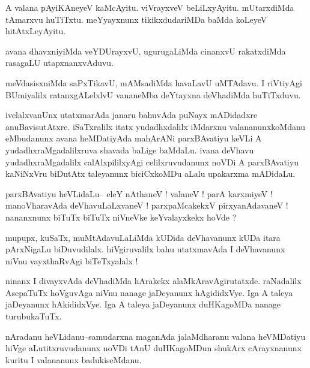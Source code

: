 \documentclass{article}
\begin{document}
\begin{mn}%
A valana pAyiKAneyeV kaMcAyitu. viVrayxveV beLiLxyAyitu. mUtarxdiMda tAmarxvu huTiTxtu. 
meYyayxnunx tikikxdudariMDa baMda koLeyeV hitAtxLeyAyitu.
\end{mn}

\begin{mn}%
avana dhavxniyiMda veYDUrayxvU, ugurugaLiMda cinanxvU rakatxdiMda rasagaLU utapxnanxvAduvu.
\end{mn}

\begin{mn}%
meVdasisxniMda saPxTikavU, mAMsadiMda havaLavU uMTAdavu. I riVtiyAgi BUmiyalilx 
ratanxgALelxlvU vananeMba deYtayxna deVhadiMda huTiTxduvu.
\end{mn}

\begin{mn}%
ivelalxvanUnx utatxmarAda janaru bahuvAda puNayx mADidadxre anuBavisutAtxre. iSaTxralilx 
itatx yudadhxdalilx iMdarxnu valananunxkoMdanu eMbudanunx avana heMDatiyAda mahArANi 
parxBAvatiyu keVLi A yudadhxraMgadalilxruva shavada baLige baMdaLu. ivana deVhavu 
yudadhxraMgadalilx calAlxpililxyAgi celilxruvudanunx noVDi A parxBAvatiyu kaNiNxVru 
biDutAtx taleyanunx biciCxkoMDu aLalu upakarxma mADidaLu.
\end{mn}

\begin{mn}%
parxBAvatiyu heVLidaLu-- eleY nAthaneV ! valaneV ! parA karxmiyeV ! manoVharavAda 
deVhavuLaLxvaneV ! parxpaMcakekxV pirxyanAdavaneV ! nananxnunx biTuTx biTuTx niVneVke 
keYvalayxkekx hoVde ?
\end{mn}

\begin{mn}%
mupupx, kuSaTx, muMtAdavuLaLiMda kUDida deVhavanunx kUDa itara pArxNigaLu biDuvudilalx. 
hiVgiruvalilx bahu utatxmavAda I deVhavanunx niVnu vayxthaRvAgi biTeTxyalalx ! 
\end{mn}

\begin{mn}%
ninanx I divayxvAda deVhadiMda hArakekx alaMkAravAgirutatxde. raNadalilx AsepaTuTx hoVguvAga 
niVnu nanage jaDeyanunx hAgididxVye. Iga A taleya jaDeyanunx hAkididxVye. Iga A taleya 
jaDeyanunx duHKagoMDa nanage turubukaTuTx.
\end{mn}

\begin{mn}%
nAradanu heVLidanu--samudarxna maganAda jalaMdharanu valana heVMDatiyu hiVge 
aLutitxruvudanunx noVDi tAnU duHKagoMDun shukArx cArayxnanunx kuritu I valananunx 
badukiseMdanu.
\end{mn}
\end{document}
